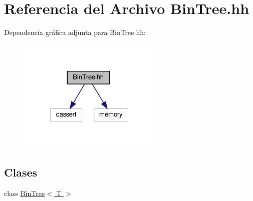 \hypertarget{_bin_tree_8hh}{}\section{Referencia del Archivo Bin\+Tree.\+hh}
\label{_bin_tree_8hh}
Dependencia gráfica adjunta para Bin\+Tree.\+hh\+:\nopagebreak
\begin{figure}[H]
\begin{center}
\leavevmode
\includegraphics[width=196pt]{_bin_tree_8hh__incl}
\end{center}
\end{figure}
\subsection*{Clases}
\begin{DoxyCompactItemize}
\item 
class \hyperlink{class_bin_tree}{Bin\+Tree$<$ T $>$}
\end{DoxyCompactItemize}
